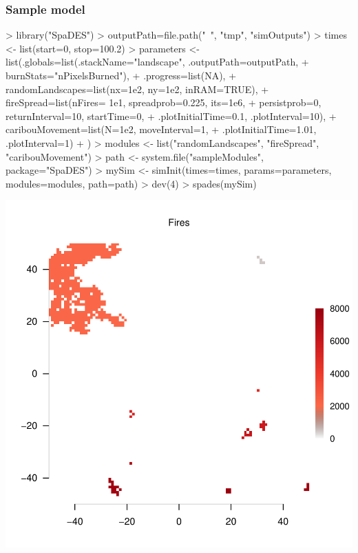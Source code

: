 \documentclass{article}
\begin{document}
\newpage

\subsubsection{Sample model}

\begin{Schunk}
\begin{Sinput}
> library("SpaDES")
> outputPath=file.path("~", "tmp", "simOutputs")
> times <- list(start=0, stop=100.2)
> parameters <- list(.globals=list(.stackName="landscape", .outputPath=outputPath,
+                                  burnStats="nPixelsBurned"),
+                    .progress=list(NA),
+                    randomLandscapes=list(nx=1e2, ny=1e2, inRAM=TRUE),
+                    fireSpread=list(nFires= 1e1, spreadprob=0.225, its=1e6,
+                                    persistprob=0, returnInterval=10, startTime=0,
+                                   .plotInitialTime=0.1, .plotInterval=10),
+                    caribouMovement=list(N=1e2, moveInterval=1,
+                                         .plotInitialTime=1.01, .plotInterval=1)
+                    )
> modules <- list("randomLandscapes", "fireSpread", "caribouMovement")
> path <- system.file("sampleModules", package="SpaDES")
> mySim <- simInit(times=times, params=parameters, modules=modules, path=path)
> dev(4)
> spades(mySim)
\end{Sinput}
\end{Schunk}
\includegraphics{introduction-using-SpaDES}
\end{document}
